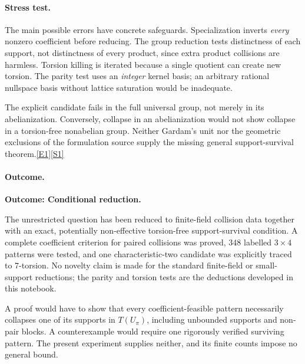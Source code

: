 \documentclass[11pt,a4paper]{article}
\newcommand{\sref}[2]{\hyperlink{source:#1:#2}{[S#2]}}
\newcommand{\eref}[2]{\hyperlink{extra:#1:#2}{[E#2]}}
\begin{document}
\paragraph{Stress test.}
The main possible errors have concrete safeguards. Specialization
inverts \emph{every} nonzero coefficient before reducing. The group
reduction tests distinctness of each support, not distinctness of every
product, since extra product collisions are harmless. Torsion killing
is iterated because a single quotient can create new torsion. The parity
test uses an \emph{integer} kernel basis; an arbitrary rational nullspace
basis without lattice saturation would be inadequate.

The explicit candidate fails in the full universal group, not merely in
its abelianization. Conversely, collapse in an abelianization would not
show collapse in a torsion-free nonabelian group. Neither Gardam's unit
nor the geometric exclusions of the formulation source supply the
missing general support-survival theorem.\eref{30006789}{1}\sref{30006789}{1}

\paragraph{Outcome.}
\textbf{Outcome: Conditional reduction.}

The unrestricted question has been reduced to finite-field collision
data together with an exact, potentially non-effective torsion-free
support-survival condition. A complete coefficient criterion for paired
collisions was proved, 348 labelled $3\times4$ patterns were tested, and
one characteristic-two candidate was explicitly traced to $7$-torsion.
No novelty claim is made for the standard finite-field or small-support
reductions; the parity and torsion tests are the deductions developed
in this notebook.

A proof would have to show that every coefficient-feasible pattern
necessarily collapses one of its supports in $T(U_\pi)$, including
unbounded supports and non-pair blocks. A counterexample would require
one rigorously verified surviving pattern. The present experiment
supplies neither, and its finite counts impose no general bound.

\end{document}
